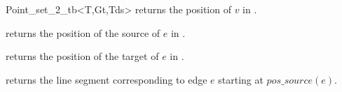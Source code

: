 \begin{ccRefClass}{Point_set_2_tb<T,Gt,Tds>}
{ returns the position of $v$ in \ccVar.}
    
{ returns the position of the source of $e$ in \ccVar.}
   
{ returns the position of the target of $e$ in \ccVar.}
    
{ returns the line segment corresponding to edge $e$ starting
at $pos\_source(e)$.}
   

\ccHtmlLinksOn

\end{ccRefClass} 
